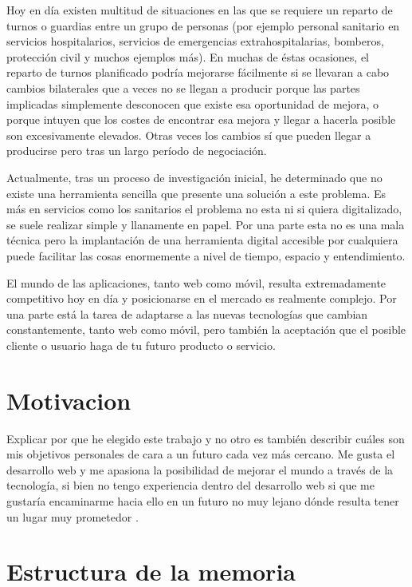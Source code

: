 

Hoy en día existen multitud de situaciones en las que se requiere un reparto de turnos o guardias entre un grupo de personas (por ejemplo personal sanitario en servicios hospitalarios, servicios de emergencias extrahospitalarias, bomberos, protección civil y muchos ejemplos más). En muchas de éstas ocasiones, el reparto de turnos planificado podría mejorarse fácilmente si se llevaran a cabo cambios bilaterales que a veces no se llegan a producir porque las partes implicadas simplemente desconocen que existe esa oportunidad de mejora, o porque intuyen que los costes de encontrar esa mejora y llegar a  hacerla posible son excesivamente elevados. Otras veces los cambios sí que pueden llegar a producirse pero tras un largo período de negociación.

Actualmente, tras un proceso de investigación inicial, he determinado que no existe una herramienta sencilla que presente una solución a este problema. Es más en servicios como los sanitarios el problema no esta ni si quiera digitalizado, se suele realizar simple y llanamente en papel. Por una parte esta no es una mala técnica pero la implantación de una herramienta digital accesible por cualquiera puede facilitar las cosas enormemente a nivel de tiempo, espacio y entendimiento. 

El mundo de las aplicaciones, tanto web como móvil, resulta extremadamente competitivo hoy en día y posicionarse en el mercado es realmente complejo. Por una parte está la tarea de adaptarse a las nuevas tecnologías que cambian constantemente, tanto web como móvil, pero también la aceptación que el posible cliente o usuario haga de tu futuro producto o servicio.

\section{Motivacion}\label{Motivacion}

Explicar por que he elegido este trabajo y no otro es también describir cuáles son mis objetivos personales de cara a un futuro cada vez más cercano.  Me gusta el desarrollo web y me apasiona la posibilidad de mejorar el mundo a través de la tecnología, si bien no tengo experiencia dentro del desarrollo web si que me gustaría encaminarme hacia ello en un futuro no muy lejano dónde resulta tener un lugar muy prometedor \citep{desarrolloweb1}.

\section{Estructura de la memoria}\label{estructura-de-la-memoria}

